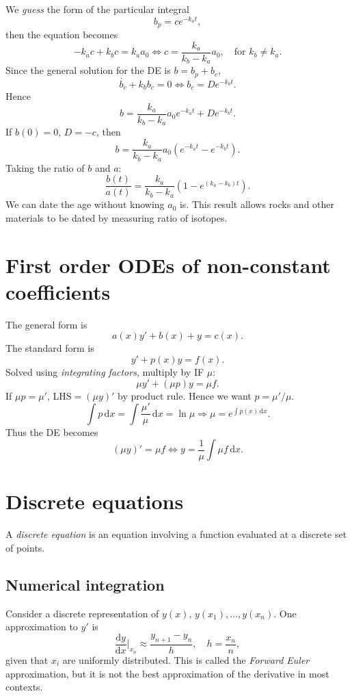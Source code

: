 \documentclass[10pt]{article}
\begin{document}
    We \textit{guess} the form of the particular integral
    \[
        b_p = ce^{-k_a t}
    ,\]
    then the equation becomes 
    \[
        -k_a c+k_b c = k_a a_0 \Longleftrightarrow c=\frac{k_a}{k_b-k_a}a_0,\quad \text{for }k_b\neq k_a
    .\]
    Since the general solution for the DE is $b=b_p+b_c$,
    \[
        \dot{b_c}+k_b b_c = 0 \Longleftrightarrow b_c = De^{-k_b t}
    .\]
    Hence
    \[
        b=\frac{k_{a}}{k_{b}-k_{a}} a_{0} e^{-k_{a} t}+D e^{-k_{b} t}
    .\]
    If $b(0)=0$, $ D = -c $, then 
    \[
        b = \frac{k_a}{k_b-k_a}a_0\left( e^{-k_a t}-e^{-k_b t} \right)
    .\]
    Taking the ratio of $ b $ and $a$:
    \[
        \frac{b(t)}{a(t)} = \frac{k_a}{k_b-k_a}\left( 1-e^{(k_a-k_b)t} \right)
    .\]
    We can date the age without knowing $a_0$ is. This result allows rocks and other materials to be dated by measuring ratio of isotopes.
    \section{First order ODEs of non-constant coefficients}
    The general form is 
    \[
        a(x)y'+b(x)+y = c(x)
    .\]
    The standard form is 
    \[
        y'+ p(x)y=f(x)
    .\]
    Solved using \textit{integrating factors}, multiply by IF $\mu$:
    \[
        \mu y'+(\mu p)y=\mu f
    .\]
    If $ \mu p=\mu' $, LHS$= (\mu y)' $ by product rule. Hence we want $p = \mu'/\mu$.
    \[
        \int p \,\mathrm{d}x = \int \frac{\mu'}{\mu} \,\mathrm{d}x = \ln \mu \Longrightarrow\boxed{\mu = e^{\int p(x) \,\mathrm{d}x}}
    .\]
    Thus the DE becomes 
    \[
        (\mu y)' = \mu f \Longleftrightarrow y = \frac{1}{\mu}\int \mu f \,\mathrm{d}x
    .\]
    \section{Discrete equations}
    A \textit{discrete equation} is an equation involving a function evaluated at a discrete set of points.
    \subsection{Numerical integration}
    Consider a discrete representation of $y(x)$, $ y(x_1),\dots,y(x_{n}) $. One approximation to $y'$ is 
    \[
        \frac{\mathrm{d}y}{\mathrm{d}x}\Big|_{x_n} \approx \frac{y_{n+1}-y_n}{h},\quad h=\frac{x_n}{n} 
    ,\]
    given that $x_i$ are uniformly distributed. This is called the \textit{Forward Euler} approximation, but it is not the best approximation of the derivative in most contexts.
    
\end{document}

